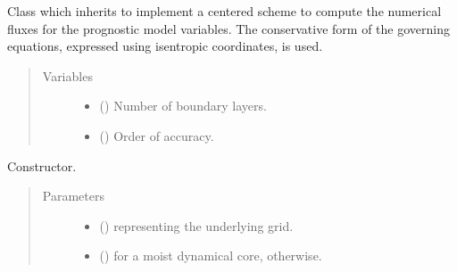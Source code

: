 \documentclass[letterpaper,10pt,english]{sphinxmanual}
\begin{document}
\begin{fulllineitems}
\label{\detokenize{api:dycore.flux_isentropic_centered.FluxIsentropicCentered}}
Class which inherits  to implement a
centered scheme to compute the numerical fluxes for the prognostic model variables.
The conservative form of the governing equations, expressed using isentropic coordinates, is used.
\begin{quote}\begin{description}
\item[{Variables}] \leavevmode\begin{itemize}
\item {} 
{\hyperref[\detokenize{api:dycore.prognostic_isentropic.PrognosticIsentropic.nb}]{}} () \textendash{} Number of boundary layers.

\item {} 
 () \textendash{} Order of accuracy.

\end{itemize}

\end{description}\end{quote}

\begin{fulllineitems}
\label{\detokenize{api:dycore.flux_isentropic_centered.FluxIsentropicCentered.__init__}}
Constructor.
\begin{quote}\begin{description}
\item[{Parameters}] \leavevmode\begin{itemize}
\item {} 
 () \textendash{} {\hyperref[\detokenize{api:grids.grid_xyz.GridXYZ}]{}} representing the underlying grid.

\item {} 
 () \textendash{}  for a moist dynamical core,  otherwise.


\end{itemize}
\end{description}
\end{quote}
\end{fulllineitems}
\end{fulllineitems}
\end{document}
